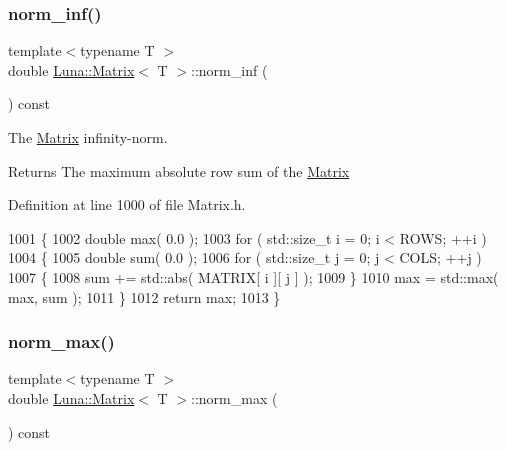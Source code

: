 \subsubsection{\texorpdfstring{norm\+\_\+inf()}{norm\_inf()}}
{\footnotesize\ttfamily template$<$typename T $>$ \\
double \hyperlink{classLuna_1_1Matrix}{Luna\+::\+Matrix}$<$ T $>$\+::norm\+\_\+inf (\begin{DoxyParamCaption}{ }\end{DoxyParamCaption}) const\hspace{0.3cm}{\ttfamily [inline]}}



The \hyperlink{classLuna_1_1Matrix}{Matrix} infinity-\/norm. 

\begin{DoxyReturn}{Returns}
The maximum absolute row sum of the \hyperlink{classLuna_1_1Matrix}{Matrix} 
\end{DoxyReturn}


Definition at line 1000 of file Matrix.\+h.


\begin{DoxyCode}
1001   \{
1002     \textcolor{keywordtype}{double} max( 0.0 );
1003     \textcolor{keywordflow}{for} ( std::size\_t i = 0; i < ROWS; ++i )
1004     \{
1005         \textcolor{keywordtype}{double} sum( 0.0 );
1006         \textcolor{keywordflow}{for} ( std::size\_t j = 0; j < COLS; ++j )
1007         \{
1008             sum += std::abs( MATRIX[ i ][ j ] );
1009         \}
1010         max = std::max( max, sum );
1011     \}
1012     \textcolor{keywordflow}{return} max;
1013   \}
\end{DoxyCode}
\mbox{\label{classLuna_1_1Matrix_a1db72e57e9efbd1de2c34ea405184292}} 
\subsubsection{\texorpdfstring{norm\+\_\+max()}{norm\_max()}}
{\footnotesize\ttfamily template$<$typename T $>$ \\
double \hyperlink{classLuna_1_1Matrix}{Luna\+::\+Matrix}$<$ T $>$\+::norm\+\_\+max (\begin{DoxyParamCaption}{ }\end{DoxyParamCaption}) const\hspace{0.3cm}{\ttfamily [inline]}}



